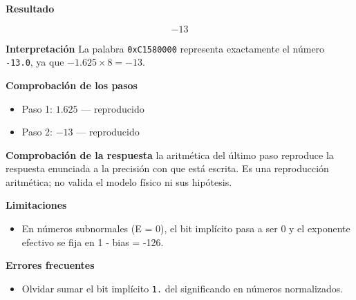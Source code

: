 \documentclass{book}
\begin{document}
\begin{tcolorbox}[title={Problema resuelto}, studiumworked, breakable]
\noindent\textbf{Resultado}

\[
-13
\]

\noindent\textbf{Interpretación}
La palabra \texttt{0xC1580000} representa exactamente el número \texttt{-13.0}, ya que \(-1.625 \times 8 = -13\).

\noindent\textbf{Comprobación de los pasos}
\begin{itemize}
\item Paso 1: $1.625$ — reproducido
\item Paso 2: $-13$ — reproducido
\end{itemize}

\noindent\textbf{Comprobación de la respuesta} la aritmética del último paso reproduce la respuesta enunciada a la precisión con que está escrita. Es una reproducción aritmética; no valida el modelo físico ni sus hipótesis.

\noindent\textbf{Limitaciones}
\begin{itemize}
\item En números subnormales (E = 0), el bit implícito pasa a ser 0 y el exponente efectivo se fija en 1 - bias = -126.
\end{itemize}

\noindent\textbf{Errores frecuentes}
\begin{itemize}
\item Olvidar sumar el bit implícito \texttt{1.} del significando en números normalizados.
\end{itemize}
\end{tcolorbox}
\end{document}
